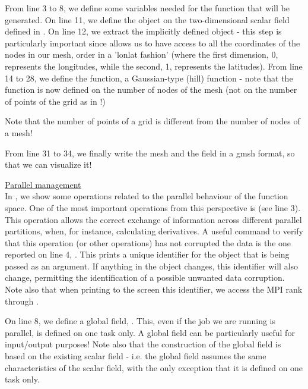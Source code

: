 \begin{description}
From line 3 to 8, we define some variables needed for the function 
that will be generated. On line 11, we define the  
object on the two-dimensional scalar field defined in .
On line 12, we extract the implicitly defined  object 
- this step is particularly important since allows us to have access 
to all the coordinates of the nodes in our mesh, order in a 'lonlat
fashion' (where the first dimension, 0, represents the longitudes, 
while the second, 1, represents the latitudes).	
From line 14 to 28, we define the function, a Gaussian-type (hill) 
function - note that the function is now defined on the number of 
nodes of the mesh (not on the number of points of the grid as in 
!)
%
\begin{warningbox}
Note that the number of points of a grid is different from the number 
of nodes of a mesh!
\end{warningbox}
%
From line 31 to 34, we finally write the mesh and the field in a gmsh 
format, so that we can visualize it!
%

%
%
\item \underline{Parallel management}\\[0.5em]
%
In , we show some operations related to the 
parallel behaviour of the function space. One of the most important
operations from this perspective is  (see line 3). 
This operation allows the correct exchange of information across different 
parallel partitions, when, for instance, calculating derivatives.
A useful command to verify that this operation (or other operations) 
has not corrupted the data is the one reported on line 4, .
This prints a unique identifier for the object that is being passed 
as an argument. If anything in the object changes, this identifier 
will also change, permitting the identification of a possible unwanted 
data corruption. Note also that when printing to the screen this identifier,
we access the MPI rank through .

On line 8, we define a global field, . 
This, even if the job we are running is parallel, is defined on one task 
only. A global field can be particularly useful for input/output purposes!
Note also that the construction of the global field is based on the existing 
scalar field - i.e. the global field assumes the same characteristics of 
the scalar field, with the only exception that it is defined on one task
only.


\end{description}
